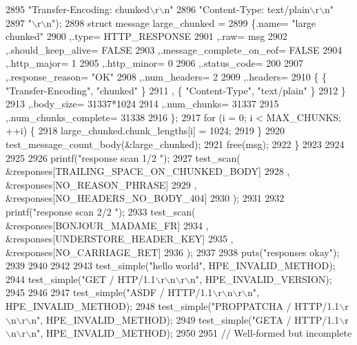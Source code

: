 \begin{DoxyCode}
{2895       \textcolor{stringliteral}{"Transfer-Encoding: chunked\(\backslash\)r\(\backslash\)n"}
2896       \textcolor{stringliteral}{"Content-Type: text/plain\(\backslash\)r\(\backslash\)n"}
2897       \textcolor{stringliteral}{"\(\backslash\)r\(\backslash\)n"});
2898     \textcolor{keyword}{struct }message large\_chunked =
2899       \{.name= \textcolor{stringliteral}{"large chunked"}
2900       ,.type= HTTP_RESPONSE
2901       ,.raw= msg
2902       ,.should\_keep\_alive= FALSE
2903       ,.message\_complete\_on\_eof= FALSE
2904       ,.http\_major= 1
2905       ,.http\_minor= 0
2906       ,.status\_code= 200
2907       ,.response\_reason= \textcolor{stringliteral}{"OK"}
2908       ,.num\_headers= 2
2909       ,.headers=
2910         \{ \{ \textcolor{stringliteral}{"Transfer-Encoding"}, \textcolor{stringliteral}{"chunked"} \}
2911         , \{ \textcolor{stringliteral}{"Content-Type"}, \textcolor{stringliteral}{"text/plain"} \}
2912         \}
2913       ,.body\_size= 31337*1024
2914       ,.num\_chunks= 31337
2915       ,.num\_chunks\_complete= 31338
2916       \};
2917     \textcolor{keywordflow}{for} (i = 0; i < MAX_CHUNKS; ++i) \{
2918       large\_chunked.chunk_lengths[i] = 1024;
2919     \}
2920     test_message_count_body(&large\_chunked);
2921     free(msg);
2922   \}
2923 
2924 
2925 
2926   printf(\textcolor{stringliteral}{"response scan 1/2      "});
2927   test_scan( &responses[TRAILING_SPACE_ON_CHUNKED_BODY]
2928            , &responses[NO_REASON_PHRASE]
2929            , &responses[NO_HEADERS_NO_BODY_404]
2930            );
2931 
2932   printf(\textcolor{stringliteral}{"response scan 2/2      "});
2933   test_scan( &responses[BONJOUR_MADAME_FR]
2934            , &responses[UNDERSTORE_HEADER_KEY]
2935            , &responses[NO_CARRIAGE_RET]
2936            );
2937 
2938   puts(\textcolor{stringliteral}{"responses okay"});
2939 
2940 
2942 
2943   test_simple(\textcolor{stringliteral}{"hello world"}, HPE_INVALID_METHOD);
2944   test_simple(\textcolor{stringliteral}{"GET / HTP/1.1\(\backslash\)r\(\backslash\)n\(\backslash\)r\(\backslash\)n"}, HPE_INVALID_VERSION);
2945 
2946 
2947   test_simple(\textcolor{stringliteral}{"ASDF / HTTP/1.1\(\backslash\)r\(\backslash\)n\(\backslash\)r\(\backslash\)n"}, HPE_INVALID_METHOD);
2948   test_simple(\textcolor{stringliteral}{"PROPPATCHA / HTTP/1.1\(\backslash\)r\(\backslash\)n\(\backslash\)r\(\backslash\)n"}, HPE_INVALID_METHOD);
2949   test_simple(\textcolor{stringliteral}{"GETA / HTTP/1.1\(\backslash\)r\(\backslash\)n\(\backslash\)r\(\backslash\)n"}, HPE_INVALID_METHOD);
2950 
2951   \textcolor{comment}{// Well-formed but incomplete}
}
\end{DoxyCode}
